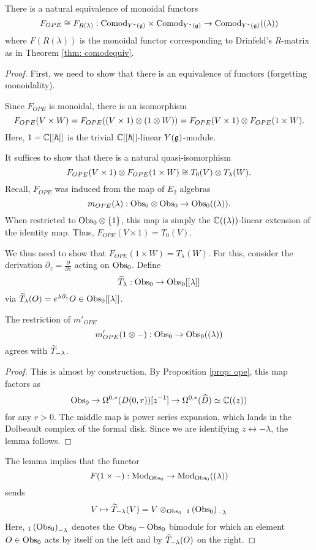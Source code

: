 \documentclass[11pt]{amsart}
\def\yscomod{{\rm Comod}_{Y^*(\fg)}}
\def\yslcomod{{\rm Comod}_{Y^*(\fg)}((\lambda))}
\begin{document}
\begin{thm} 
There is a natural equivalence of monoidal functors
\[
F_{OPE} \cong F_{R(\lambda)} : \yscomod \times \yscomod \to \yslcomod
\]
where $F(R(\lambda))$ is the monoidal functor corresponding to Drinfeld's $R$-matrix as in Theorem \ref{thm: comodequiv}.
\end{thm}  
\begin{proof}
First, we need to show that there is an equivalence of functors (forgetting monoidality). 

Since $F_{OPE}$ is monoidal, there is an isomorphism
\[
F_{OPE} (V \times W) = F_{OPE}( (V \times 1) \tensor (1 \tensor W)) = F_{OPE} (V \times 1) \tensor F_{OPE}(1 \times W).
\]
Here, $1 = \CC[[\hbar]]$ is the trivial $\CC[[\hbar]]$-linear $Y(\fg)$-module.

It suffices to show that there is a natural quasi-isomorphism
\[
F_{OPE} (V \times 1) \tensor F_{OPE}(1 \times W) \cong T_0(V) \tensor T_\lambda(W) .
\]
Recall, $F_{OPE}$ was induced from the map of $E_2$ algebras
\[
m_{OPE}(\lambda) : \Obs_0 \tensor \Obs_0 \to \Obs_0((\lambda)) .
\]
When restricted to $\Obs_0 \tensor \{1\}$, this map is simply the $\CC((\lambda))$-linear extension of the identity map. 
Thus, $F_{OPE} (V \times 1) = T_0(V)$. 

We thus need to show that $F_{OPE} (1 \times W) = T_\lambda(W)$. 
For this, consider the derivation $\partial_z = \frac{\partial}{\partial z}$ acting on $\Obs_0$. 
Define
\[
\Tilde{T}_\lambda : \Obs_0 \to \Obs_0 [[\lambda]]
\]
via $\Tilde{T}_\lambda (O) = e^{\lambda \partial_z} O \in \Obs_0 [[\lambda]]$. 

\begin{lem}
The restriction of $m'_{OPE}$
\[
m'_{OPE} (1 \tensor -) : \Obs_0 \to \Obs_0((\lambda))
\]
agrees with $\Tilde{T}_{-\lambda}$. 
\end{lem}
\begin{proof}
This is almost by construction. 
By Proposition \ref{prop: ope}, this map factors as
\[
\Obs_0 \to \Omega^{0,*}(D(0,r))[z^{-1}] \to \Omega^{0,*}(\Hat{D}) \simeq \CC((z))
\]
for any $r > 0$.
The middle map is power series expansion, which lands in the Dolbeault complex of the formal disk.
Since we are identifying $z \leftrightarrow -\lambda$, the lemma follows.
\end{proof}

The lemma implies that the functor 
\[
F(1 \times -) : \Obsmod \to \Obslmod
\]
sends 
\[
V \mapsto \Tilde{T}_{-\lambda}(V) = V \tensor_{\Obs_0} \;_1\left(\Obs_0\right)_{-\lambda}
\]
Here, $_1\left(\Obs_0\right)_{-\lambda}$ denotes the $\Obs_0 - \Obs_0$ bimodule for which an element $O \in \Obs_0$ acts by itself on the left and by $\Tilde{T}_{-\lambda}(O)$ on the right. 


\end{proof}
\end{document}

